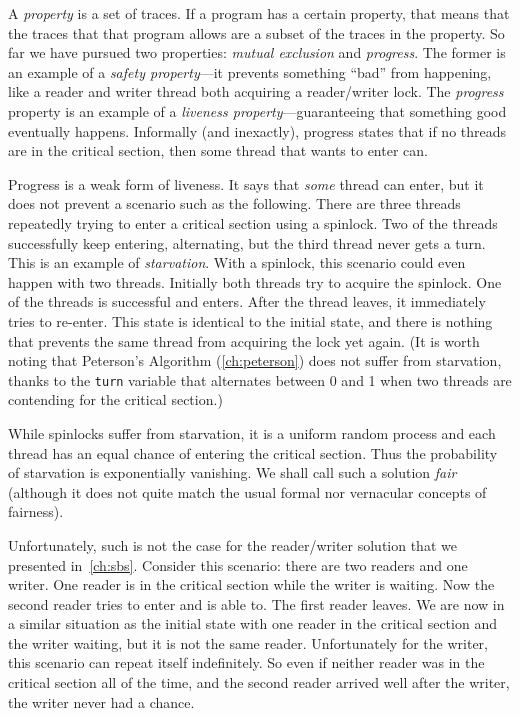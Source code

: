 \documentclass{report}
\begin{document}
%

A \emph{property}
%
is a set of traces.
If a program has a certain property, that means that the traces that that
program allows are a subset of the traces in the property.
So far we have pursued two properties: \emph{mutual exclusion}
and \emph{progress}.  The former is an example of a
\emph{safety property}---it prevents something ``bad'' from
happening, like a reader and writer thread both acquiring a
reader/writer lock.
The \emph{progress} property is an example
of a \emph{liveness property}---guaranteeing that something good
eventually happens.
Informally (and inexactly), progress states that if no threads
are in the critical section, then some thread that wants to enter
can.

Progress is a weak form of liveness.  It says that \emph{some}
thread can enter, but it does not prevent a scenario such as
the following.  There are three threads repeatedly trying to
enter a critical section using a spinlock.  Two of
the threads successfully keep entering, alternating, but the third
thread never gets a turn.  This is an example of
\emph{starvation}.  With a spinlock, this scenario could
even happen with two threads.  Initially both threads
try to acquire the spinlock.  One of the threads is
successful and enters.  After the thread leaves, it immediately
tries to re-enter.  This state is identical to the initial
state, and there is nothing that prevents the same thread
from acquiring the lock yet again.
%
(It is worth noting that Peterson's Algorithm (\autoref{ch:peterson})
does not suffer from starvation, thanks to the \texttt{turn} variable
that alternates between 0 and 1 when two threads are contending for
the critical section.)

While spinlocks suffer from starvation, it is a uniform random
process and each thread has an equal chance of entering the critical
section.  Thus the probability of starvation is exponentially vanishing.
We shall call such a solution \emph{fair}
%
(although it does not quite
match the usual formal nor vernacular concepts of fairness).

%

Unfortunately, such is not the case for the
reader/writer solution that we presented in~\autoref{ch:sbs}.
Consider this scenario: there are two readers and one writer.  One reader
is in the critical section while the writer is waiting.  Now the
second reader tries to enter and is able to.  The first reader leaves.
We are now in a similar situation as the initial state with one reader
in the critical section and the writer waiting, but it is not the same
reader.  Unfortunately for the writer, this scenario can repeat itself
indefinitely.  So even if neither reader was in the critical section
all of the time, and the second reader arrived well after the writer,
the writer never had a chance.
\end{document}
